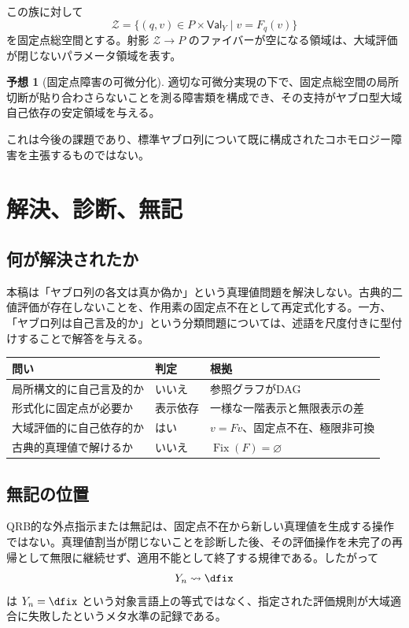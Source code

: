\documentclass[a4paper,11pt]{ltjsarticle}
\theoremstyle{definition}
\newtheorem{conjecture}[definition]{予想}
\theoremstyle{plain}
\newcommand{\Val}{\mathsf{Val}}
\newcommand{\Fix}{\operatorname{Fix}}
\begin{document}
この族に対して
\begin{equation}
 \mathcal Z=
 \{(q,v)\in P\times\Val_Y\mid v=F_q(v)\}
\end{equation}
を固定点総空間とする。射影 $\mathcal Z\to P$ のファイバーが空になる領域は、大域評価が閉じないパラメータ領域を表す。

\begin{conjecture}[固定点障害の可微分化]
適切な可微分実現の下で、固定点総空間の局所切断が貼り合わさらないことを測る障害類を構成でき、その支持がヤブロ型大域自己依存の安定領域を与える。
\end{conjecture}

これは今後の課題であり、標準ヤブロ列について既に構成されたコホモロジー障害を主張するものではない。

\section{解決、診断、無記}

\subsection{何が解決されたか}

本稿は「ヤブロ列の各文は真か偽か」という真理値問題を解決しない。古典的二値評価が存在しないことを、作用素の固定点不在として再定式化する。一方、「ヤブロ列は自己言及的か」という分類問題については、述語を尺度付きに型付けすることで解答を与える。

\begin{center}
\begin{tabular}{p{} p{} p{}}
\toprule
問い & 判定 & 根拠 \\
\midrule
局所構文的に自己言及的か & いいえ & 参照グラフがDAG \\
形式化に固定点が必要か & 表示依存 & 一様な一階表示と無限表示の差 \\
大域評価的に自己依存的か & はい & $v=Fv$、固定点不在、極限非可換 \\
古典的真理値で解けるか & いいえ & $\Fix(F)=\varnothing$ \\
\bottomrule
\end{tabular}
\end{center}

\subsection{無記の位置}

QRB的な外点指示または無記は、固定点不在から新しい真理値を生成する操作ではない。真理値割当が閉じないことを診断した後、その評価操作を未完了の再帰として無限に継続せず、適用不能として終了する規律である。したがって
\begin{equation}
 Y_n\rightsquigarrow\dfix
\end{equation}
は $Y_n=\dfix$ という対象言語上の等式ではなく、指定された評価規則が大域適合に失敗したというメタ水準の記録である。
\end{document}

